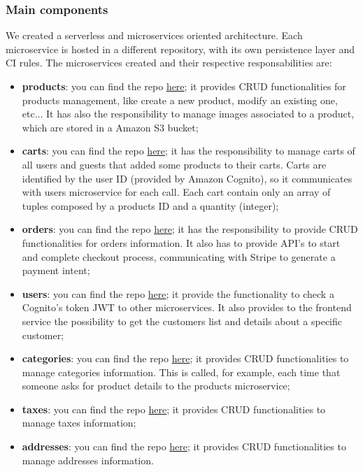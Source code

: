 \subsubsection{Main components}
We created a serverless and microservices oriented architecture. Each microservice is hosted in a different repository, with its own persistence layer and CI rules.
The microservices created and their respective responsabilities are:
\begin{itemize}
    \item \textbf{products}: you can find the repo \href{https://github.com/SWException/products}{here}; it provides CRUD functionalities for products management,
          like create a new product, modify an existing one, etc... It has also the responsibility to manage images associated to a product, which are
          stored in a Amazon S3 bucket;
    \item \textbf{carts}: you can find the repo \href{https://github.com/SWException/carts}{here}; it has the responsibility to manage carts of all users and guests that
          added some products to their carts. Carts are identified by the user ID (provided by Amazon Cognito), so it communicates with users microservice for each call.
          Each cart contain only an array of tuples composed by a products ID and a quantity (integer);
    \item \textbf{orders}: you can find the repo \href{https://github.com/SWException/orders}{here}; it has the responsibility to provide CRUD functionalities for orders information.
          It also has to provide API's to start and complete checkout process, communicating with Stripe to generate a payment intent;
    \item \textbf{users}: you can find the repo \href{https://github.com/SWException/users}{here}; it provide the functionality to check a Cognito's token JWT to other microservices.
          It also provides to the frontend service the possibility to get the customers list and details about a specific customer;
    \item \textbf{categories}: you can find the repo \href{https://github.com/SWException/categories}{here}; it provides CRUD functionalities to manage categories information.
          This is called, for example, each time that someone asks for product details to the products microservice;
    \item \textbf{taxes}: you can find the repo \href{https://github.com/SWException/taxes}{here}; it provides CRUD functionalities to manage taxes information;
    \item \textbf{addresses}: you can find the repo \href{https://github.com/SWException/addresses}{here}; it provides CRUD functionalities to manage addresses information.
\end{itemize}

